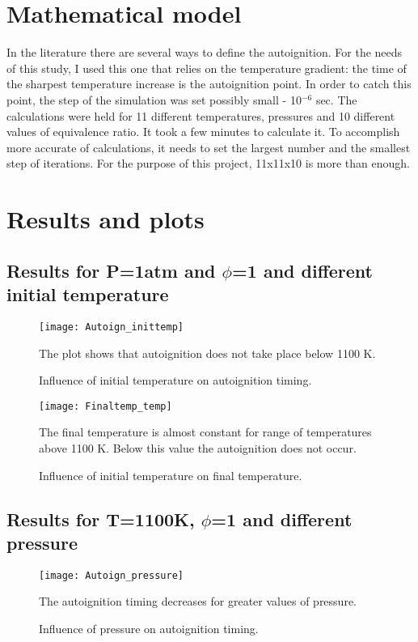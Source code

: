 \documentclass[11pt]{article}
\begin{document}
\section{Mathematical model}
In the literature there are several ways to define the autoignition. For the needs of this study, I used this one that relies on the temperature gradient: the time of the sharpest temperature increase is the autoignition point. In order to catch this point, the step of the simulation was set possibly small - 10{$^{-6}$} sec. The calculations were held for 11 different temperatures, pressures and 10 different values of equivalence ratio. It took a few minutes to calculate it. To accomplish more accurate of calculations, it needs to set the largest number and the smallest step of iterations. For the purpose of this project, 11x11x10 is more than enough.

\section{Results and plots}

\subsection{Results for P=1atm and $\phi$=1 and different initial temperature}
\begin{figure} [H]
	\begin{center}
    	\texttt{[image: Autoign\_inittemp]}
        \caption{Influence of initial temperature on autoignition timing.}
    \end{center}
\normalsize
{The plot shows that autoignition does not take place below 1100 K.}
\end{figure}

\begin{figure} [H]
	\begin{center}
    	\texttt{[image: Finaltemp\_temp]}
        \caption{Influence of initial temperature on final temperature.}
    \end{center}
\normalsize
{The final temperature is almost constant for range of temperatures above 1100 K. Below this value the autoignition does not occur. }
\end{figure}

\subsection{Results for T=1100K, $\phi$=1 and different pressure}
\begin{figure} [H]
	\begin{center}
    	\texttt{[image: Autoign\_pressure]}
        \caption{Influence of pressure on autoignition timing.}
    \end{center}
\normalsize
{The autoignition timing decreases for greater values of pressure.}
\end{figure}
\end{document}

